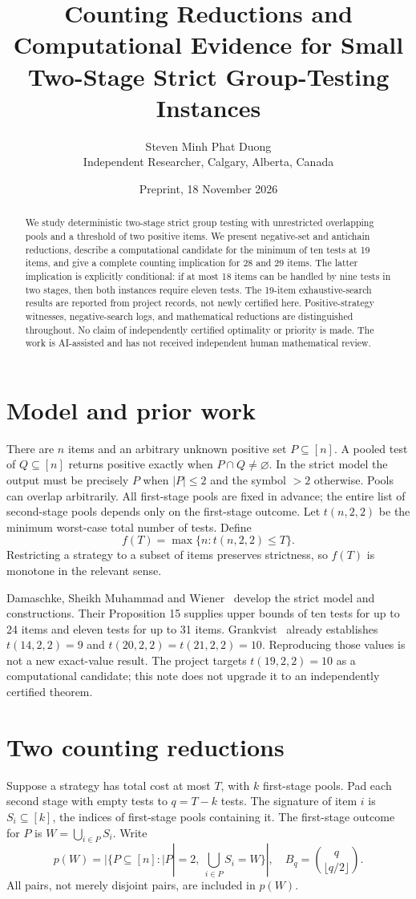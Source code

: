 \documentclass[11pt]{article}
\title{Counting Reductions and Computational Evidence for Small Two-Stage Strict Group-Testing Instances}
\author{Steven Minh Phat Duong\\\small Independent Researcher, Calgary, Alberta, Canada}
\date{Preprint, 18 November 2026}
\begin{document}
\maketitle
\begin{abstract}
We study deterministic two-stage strict group testing with unrestricted overlapping pools and a threshold of two positive items. We present negative-set and antichain reductions, describe a computational candidate for the minimum of ten tests at 19 items, and give a complete counting implication for 28 and 29 items. The latter implication is explicitly conditional: if at most 18 items can be handled by nine tests in two stages, then both instances require eleven tests. The 19-item exhaustive-search results are reported from project records, not newly certified here. Positive-strategy witnesses, negative-search logs, and mathematical reductions are distinguished throughout. No claim of independently certified optimality or priority is made. The work is AI-assisted and has not received independent human mathematical review.
\end{abstract}

\section{Model and prior work}
There are $n$ items and an arbitrary unknown positive set $P\subseteq[n]$. A pooled test of $Q\subseteq[n]$ returns positive exactly when $P\cap Q\ne\varnothing$. In the strict model the output must be precisely $P$ when $|P|\le2$ and the symbol $>2$ otherwise. Pools can overlap arbitrarily. All first-stage pools are fixed in advance; the entire list of second-stage pools depends only on the first-stage outcome. Let $t(n,2,2)$ be the minimum worst-case total number of tests. Define
\[
f(T)=\max\{n:t(n,2,2)\le T\}.
\]
Restricting a strategy to a subset of items preserves strictness, so $f(T)$ is monotone in the relevant sense.

Damaschke, Sheikh Muhammad and Wiener~\cite{DSW} develop the strict model and constructions. Their Proposition 15 supplies upper bounds of ten tests for up to 24 items and eleven tests for up to 31 items. Grankvist~\cite{G} already establishes $t(14,2,2)=9$ and $t(20,2,2)=t(21,2,2)=10$. Reproducing those values is not a new exact-value result. The project targets $t(19,2,2)=10$ as a computational candidate; this note does not upgrade it to an independently certified theorem.

\section{Two counting reductions}
Suppose a strategy has total cost at most $T$, with $k$ first-stage pools. Pad each second stage with empty tests to $q=T-k$ tests. The signature of item $i$ is $S_i\subseteq[k]$, the indices of first-stage pools containing it. The first-stage outcome for $P$ is $W=\bigcup_{i\in P}S_i$. Write
\[
p(W)=|\{P\subseteq[n]:|P|=2,\ \bigcup_{i\in P}S_i=W\}|,
\quad B_q=\binom q{\lfloor q/2\rfloor}.
\]
All pairs, not merely disjoint pairs, are included in $p(W)$.
\end{document}
